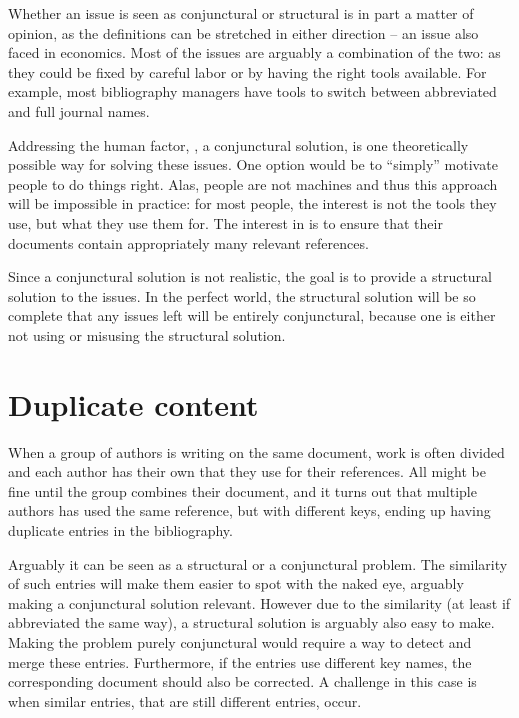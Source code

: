 Whether an issue is seen as conjunctural or structural is in part a
matter of opinion, as the definitions can be stretched in either
direction -- an issue also faced in economics.  Most of the issues are
arguably a combination of the two: as they could be fixed by careful
labor or by having the right tools available.  For example, most
bibliography managers have tools to switch between abbreviated and
full journal names.

Addressing the human factor, \ie, a conjunctural solution, is one
theoretically possible way for solving these issues.  One option would
be to ``simply'' motivate people to do things right.  Alas, people are
not machines and thus this approach will be impossible in practice:
for most people, the interest is not the tools they use, but what they
use them for.  The interest in {\bibtex} is to ensure that their
documents contain appropriately many relevant references.

Since a conjunctural solution is not realistic, the goal is to provide
a structural solution to the issues.  In the perfect world, the
structural solution will be so complete that any issues left will be
entirely conjunctural, because one is either not using or misusing the
structural solution.


\section{Duplicate content}
\label{sec:problems_duplicates}

When a group of authors is writing on the same document, work is often
divided and each author has their own  that they use for
their references.  All might be fine until the group combines their
document, and it turns out that multiple authors has used the same
reference, but with different keys, ending up having duplicate entries
in the bibliography.

Arguably it can be seen as a structural or a conjunctural problem.
The similarity of such entries will make them easier to spot with the
naked eye, arguably making a conjunctural solution relevant.  However
due to the similarity (at least if abbreviated the same way), a
structural solution is arguably also easy to make.  Making the problem
purely conjunctural would require a way to detect and merge these
entries.  Furthermore, if the entries use different key names, the
corresponding document should also be corrected. A challenge in this
case is when similar entries, that are still different entries, occur.

